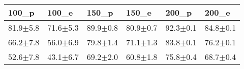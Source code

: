 \begin{tabular}{llllll}
\toprule
100_p & 100_e & 150_p & 150_e & 200_p & 200_e \\
\midrule
81.9$\pm$5.8 & 71.6$\pm$5.3 & 89.9$\pm$0.8 & 80.9$\pm$0.7 & 92.3$\pm$0.1 & 84.8$\pm$0.1 \\
66.2$\pm$7.8 & 56.0$\pm$6.9 & 79.8$\pm$1.4 & 71.1$\pm$1.3 & 83.8$\pm$0.1 & 76.2$\pm$0.1 \\
52.6$\pm$7.8 & 43.1$\pm$6.7 & 69.2$\pm$2.0 & 60.8$\pm$1.8 & 75.8$\pm$0.4 & 68.7$\pm$0.4 \\
\bottomrule
\end{tabular}
